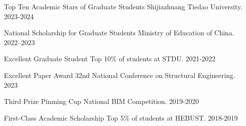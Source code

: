 
\begin{cvhonors}

  \cvhonor
    {Top Ten Academic Stars of Graduate Students}
    {Shijiazhuang Tiedao University. }
    {}
    {2023-2024}

  \cvhonor
    {National Scholarship for Graduate Students}
    {Ministry of Education of China. }
    {}
    {2022--2023}

  \cvhonor
    {Excellent Graduate Student}
    {Top 10\% of students at STDU.}
    {}
    {2021-2022}

  \cvhonor
    {Excellent Paper Award}
    {32nd National Conference on Structural Engineering. }
    {}
    {2023}

  \cvhonor
    {Third Prize}
    {Pinming Cup National BIM Competition. }
    {}
    {2019-2020}

  \cvhonor
    {First-Class Academic Scholarship}
    {Top 5\% of students at HEBUST.}
    {}
    {2018-2019}
\end{cvhonors}
